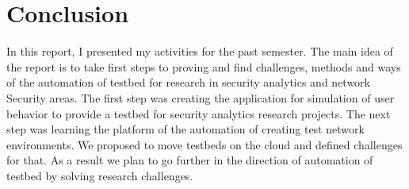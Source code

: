 
\section{Conclusion}

In this report, I presented my activities for the past semester. The main idea of the report is to take first steps to proving and find challenges, methods and ways of the automation of testbed for research in security analytics and network Security areas. The first step was creating the application for simulation of user behavior to provide a testbed for security analytics research projects. The next step was learning the platform of the automation of creating test network environments. We proposed to move testbeds on the cloud and defined challenges for that. As a result we plan to go further in the direction of automation of testbed by solving research challenges.